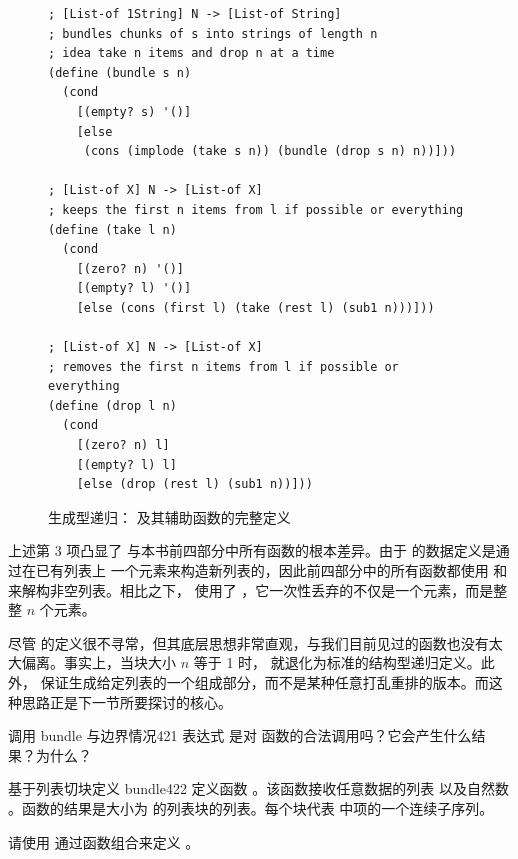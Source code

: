 \begin{figure}[htbp]
  \centering
\begin{lstlisting}[language=BSL, basicstyle=\scriptsize\ttfamily]
; [List-of 1String] N -> [List-of String]
; bundles chunks of s into strings of length n
; idea take n items and drop n at a time
(define (bundle s n)
  (cond
    [(empty? s) '()]
    [else
     (cons (implode (take s n)) (bundle (drop s n) n))]))

; [List-of X] N -> [List-of X]
; keeps the first n items from l if possible or everything
(define (take l n)
  (cond
    [(zero? n) '()]
    [(empty? l) '()]
    [else (cons (first l) (take (rest l) (sub1 n)))]))

; [List-of X] N -> [List-of X]
; removes the first n items from l if possible or everything
(define (drop l n)
  (cond
    [(zero? n) l]
    [(empty? l) l]
    [else (drop (rest l) (sub1 n))]))
\end{lstlisting}
  \caption{生成型递归： 及其辅助函数的完整定义}
  \label{fig:bundle-generative}
\end{figure}

上述第 3 项凸显了  与本书前四部分中所有函数的根本差异。由于  的数据定义是通过在已有列表上  一个元素来构造新列表的，因此前四部分中的所有函数都使用  和  来解构非空列表。相比之下， 使用了 ，它一次性丢弃的不仅是一个元素，而是整整 $n$ 个元素。

尽管  的定义很不寻常，但其底层思想非常直观，与我们目前见过的函数也没有太大偏离。事实上，当块大小 $n$ 等于 1 时， 就退化为标准的结构型递归定义。此外， 保证生成给定列表的一个组成部分，而不是某种任意打乱重排的版本。而这种思路正是下一节所要探讨的核心。

\begin{exercise}{调用 bundle 与边界情况}{421}\label{ex:421}
表达式  是对  函数的合法调用吗？它会产生什么结果？为什么？
\end{exercise}

\begin{exercise}{基于列表切块定义 bundle}{422}\label{ex:422}
定义函数 。该函数接收任意数据的列表  以及自然数 。函数的结果是大小为  的列表块的列表。每个块代表  中项的一个连续子序列。

请使用  通过函数组合来定义 。
\end{exercise}

